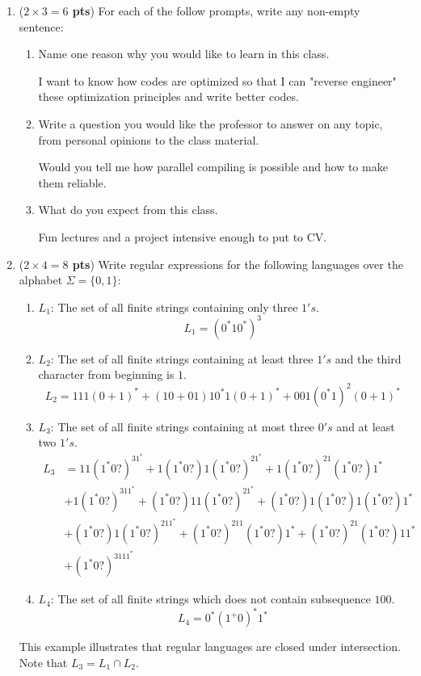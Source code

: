 \documentclass[10pt]{article}
\newcommand {\pts}[1]{({\bf #1 pts})}
\begin{document}
\begin{enumerate}
  \item \pts{$2\times 3=6$} For each of the follow prompts, write any non-empty sentence:
  \begin{enumerate}
		   \item Name one reason why you would like to learn in this class.

			I want to know how codes are optimized so that I can "reverse engineer" these optimization principles and write better codes.

		   \item Write a question you would like the professor to answer on any topic, from personal opinions to the class material.

		   Would you tell me how parallel compiling is possible and how to make them reliable.

		   \item What do you expect from this class.

		   Fun lectures and a project intensive enough to put to CV.

  \end{enumerate}
  \item \pts{$2\times 4=8$} Write regular expressions for the following languages over the alphabet $\Sigma=\{0,1\}$:
 \begin{enumerate}
		   \item $L_1$: The set of all finite strings containing only three $1's$.
			\[
			L_1 = (0^*10^*)^3
			\]
		   \item $L_2$: The set of all finite strings containing at least three $1's$ and the third character from beginning is $1$.
			\[
		   L_2 = 111(0+1)^* + (10+01)10^*1(0+1)^* + 001(0^*1)^2(0+1)^*
			\]
		   \item $L_3$: The set of all finite strings containing at most three $0's$ and at least two $1's$.
			\begin{equation}\begin{aligned}
			L_3 & = 11(1^*0?)^31^* + 1(1^*0?)1(1^*0?)^21^* + 1(1^*0?)^21(1^*0?)1^*  \\
				& + 1(1^*0?)^311^* + (1^*0?)11(1^*0?)^21^* +  (1^*0?)1(1^*0?)1(1^*0?)1^* \\
				& + (1^*0?)1(1^*0?)^211^* + (1^*0?)^211(1^*0?)1^* + (1^*0?)^21(1^*0?)11^* \\
				& + (1^*0?)^3111^*
			\end{aligned}\end{equation}
		   \item $L_4$: The set of all finite strings which does not contain subsequence $100$.
			\[
			L_4 = 0^*(1^+0)^*1^*
			\]
   \end{enumerate}
   This example illustrates that regular languages are closed under intersection. Note that
   $L_3=L_1\cap L_2$.


\end{enumerate}
\end{document}
